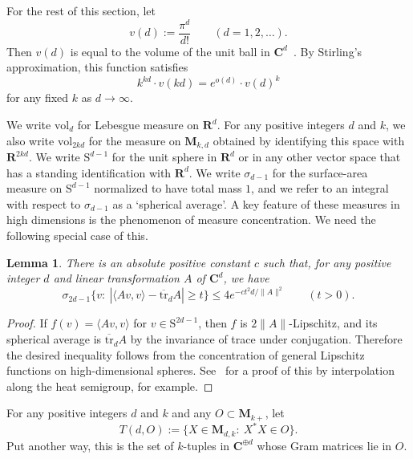 \documentclass[12pt,a4paper]{article}
\numberwithin{equation}{section}
\newtheorem{lem}[thm]{Lemma}
\theoremstyle{remark}
\renewcommand{\rm}[1]{\mathrm{#1}}
\newcommand{\bbC}{\mathbf{C}}
\newcommand{\bbR}{\mathbf{R}}
\newcommand{\rmS}{\mathrm{S}}
\newcommand{\rmM}{\mathbf{M}}
\newcommand{\s}{\sigma}
\newcommand{\vol}{\mathrm{vol}}
\newcommand{\tr}{\overline{\mathrm{tr}}}
\begin{document}
For the rest of this section, let
\begin{equation}\label{eq:ball-vol}
v(d):=\frac{\pi^d}{d!} \qquad (d=1,2,\dots).
\end{equation}
Then $v(d)$ is equal to the volume of the unit ball in $\bbC^d$~\cite[Subsec. 1.4.9]{RudinFTUB}. By Stirling's approximation, this function satisfies
\begin{equation}\label{eq:ball-vol-approx}
k^{kd}\cdot v(kd) = e^{o(d)}\cdot v(d)^k
\end{equation}
for any fixed $k$ as $d\to\infty$.

We write $\vol_d$ for Lebesgue measure on $\bbR^d$.  For any positive integers $d$ and $k$, we also write $\vol_{2kd}$ for the measure on $\rmM_{k,d}$ obtained by identifying this space with $\bbR^{2kd}$.  We write $\rm{S}^{d-1}$ for the unit sphere in $\bbR^d$ or in any other vector space that has a standing identification with $\bbR^d$. We write $\s_{d-1}$ for the surface-area measure on $\rmS^{d-1}$ normalized to have total mass $1$, and we refer to an integral with respect to $\s_{d-1}$ as a `spherical average'.  A key feature of these measures in high dimensions is the phenomenon of measure concentration.  We need the following special case of this.

\begin{lem}\label{lem:conc}
There is an absolute positive constant $c$ such that, for any positive integer $d$ and linear transformation $A$ of $\bbC^d$, we have
\[\s_{2d-1}\{v:\ | \langle Av,v\rangle - \tr_d A | \ge t\} \le 4e^{-ct^2d/\|A\|^2} \qquad (t > 0).\]
\end{lem}

\begin{proof}
If $f(v) = \langle Av,v\rangle$ for $v \in \rmS^{2d-1}$, then $f$ is $2\|A\|$-Lipschitz, and its spherical average is $\tr_d A$ by the invariance of trace under conjugation.  Therefore the desired inequality follows from the concentration of general Lipschitz functions on high-dimensional spheres.  See~\cite{Led92} for a proof of this by interpolation along the heat semigroup, for example.
\end{proof}

For any positive integers $d$ and $k$ and any $O \subset \rmM_{k+}$, let
\begin{equation}\label{eq:TnO}
	T(d,O) := \{X \in \rmM_{d,k}:\ X^\ast X \in O\}.
\end{equation}
Put another way, this is the set of $k$-tuples in $\bbC^{\oplus d}$ whose Gram matrices lie in $O$.
\end{document}
